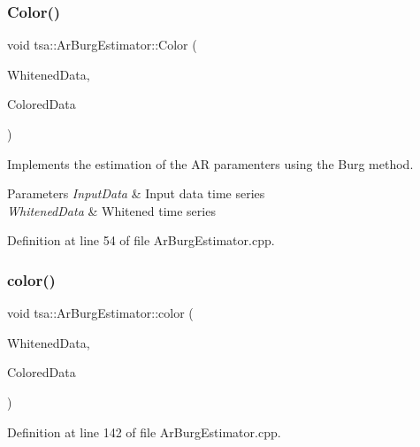 \subsubsection{\texorpdfstring{Color()}{Color()}}
{\footnotesize\ttfamily void tsa\+::\+Ar\+Burg\+Estimator\+::\+Color (\begin{DoxyParamCaption}\item[{\hyperlink{namespacetsa_ac599574bcc094eda25613724b8f3ca9e}{Seq\+View\+Double} \&}]{Whitened\+Data,  }\item[{\hyperlink{namespacetsa_ac599574bcc094eda25613724b8f3ca9e}{Seq\+View\+Double} \&}]{Colored\+Data }\end{DoxyParamCaption})}

Implements the estimation of the AR paramenters using the Burg method.


\begin{DoxyParams}{Parameters}
{\em Input\+Data} & Input data time series \\
\hline
{\em Whitened\+Data} & Whitened time series \\
\hline
\end{DoxyParams}


Definition at line 54 of file Ar\+Burg\+Estimator.\+cpp.

\mbox{\label{classtsa_1_1_ar_burg_estimator_a3b6d9a2e792b5cd1abb9c8daadc15cac}} 
\subsubsection{\texorpdfstring{color()}{color()}}
{\footnotesize\ttfamily void tsa\+::\+Ar\+Burg\+Estimator\+::color (\begin{DoxyParamCaption}\item[{matrix\+\_\+row$<$ \hyperlink{namespacetsa_ad260cd21c1891c4ed391fe788569aba4}{Dmatrix} $>$}]{Whitened\+Data,  }\item[{matrix\+\_\+row$<$ \hyperlink{namespacetsa_ad260cd21c1891c4ed391fe788569aba4}{Dmatrix} $>$}]{Colored\+Data }\end{DoxyParamCaption})}



Definition at line 142 of file Ar\+Burg\+Estimator.\+cpp.

\mbox{\label{classtsa_1_1_ar_burg_estimator_aab366c108b53cb7d4ac5b76d5f6ac465}} 
